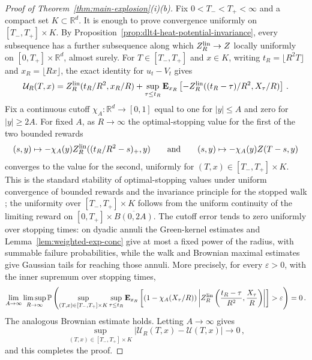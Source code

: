 \documentclass[11pt]{amsart}
\theoremstyle{plain}
\theoremstyle{definition}
\newcommand{\R}{\mathbb{R}}
\renewcommand{\P}{\mathbb{P}}
\begin{document}
	\begin{proof}[Proof of Theorem~\ref{thm:main-explosion}\textup{(i)(b)}]
		Fix $0<T_-<T_+<\infty$ and a compact set $K\subset\R^d$. It is enough
		to prove convergence uniformly on $[T_-,T_+]\times K$. By
		Proposition~\ref{prop:dlt4-heat-potential-invariance}, every
		subsequence has a further subsequence along which
		$Z_R^{\rm lin}\to Z$ locally uniformly on $[0,T_+]\times\R^d$, almost surely. For $T\in[T_-,T_+]$ and $x\in K$,
		writing
		$t_R=\lfloor R^2T\rfloor$ and $x_R=\lfloor Rx\rfloor$, the exact identity
		for $u_t-V_t$ gives
		\[
			\mathcal U_R(T,x)
			=
			Z_R^{\rm lin}(t_R/R^2,x_R/R)
			+
			\sup_{\tau\leq t_R}
			\mathbf E_{x_R}\left[
				-Z_R^{\rm lin}((t_R-\tau)/R^2,X_\tau/R)
			\right]\, .
		\]
		Fix a continuous cutoff $\chi_A:\R^d\to[0,1]$ equal to one for
		$|y|\leq A$ and zero for $|y|\geq2A$. For fixed $A$, as $R\to\infty$ the optimal-stopping
		value for the first of the two bounded rewards
		\[
			(s,y)\mapsto-\chi_A(y)Z_R^{\rm lin}((t_R/R^2-s)_+,y)
			\qquad\text{and}\qquad
			(s,y)\mapsto-\chi_A(y)Z(T-s,y)
		\]
		converges to the value for the second, uniformly for
		$(T,x)\in[T_-,T_+]\times K$. This is the
		standard stability of optimal-stopping values under uniform convergence
		of bounded rewards and the invariance principle for the stopped walk
		\citep[Theorem~3 and Corollary~4]{CoquetToldo}; the uniformity over
		$[T_-,T_+]\times K$ follows from the uniform continuity of the limiting
		reward on $[0,T_+]\times \overline{B(0,2A)}$.
		The cutoff error tends to zero uniformly over stopping times: on dyadic annuli the Green-kernel estimates and Lemma~\ref{lem:weighted-exp-conc} give at most a fixed power of the radius, with summable failure probabilities, while the walk and Brownian maximal estimates give Gaussian tails for reaching those annuli. More precisely, for every $\varepsilon>0$, with the inner supremum over stopping times,
		\[
		\lim_{A\to\infty}\limsup_{R\to\infty}
			\P\left(
			\sup_{(T,x)\in[T_-,T_+]\times K}\sup_{\tau\leq t_R}
			\mathbf E_{x_R}\left[
			(1-\chi_A(X_\tau/R))
			\left|Z_R^{\rm lin}\left(\frac{t_R-\tau}{R^2},\frac{X_\tau}{R}\right)\right|
			\right]>\varepsilon
			\right)=0\, .
		\]
		The analogous Brownian estimate holds.
		Letting $A\to\infty$ gives
		\[
			\sup_{(T,x)\in[T_-,T_+]\times K}
			|\mathcal U_R(T,x)-\mathcal U(T,x)|
			\longrightarrow0\, ,
		\]
		and this completes the proof.
		\end{proof}
\end{document}
